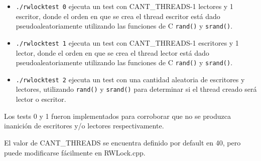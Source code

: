\begin{itemize}

\item {\texttt{./rwlocktest 0} ejecuta un test con CANT\_THREADS-1 lectores y 1 escritor, donde el orden en que se crea el thread escritor está dado pseudoaleatoriamente utilizando las funciones de C \texttt{rand()} y \texttt{srand()}.}

\item {\texttt{./rwlocktest 1} ejecuta un test con CANT\_THREADS-1 escritores y 1 lector, donde el orden en que se crea el thread lector está dado pseudoaleatoriamente utilizando las funciones de C \texttt{rand()} y \texttt{srand()}.}

\item {\texttt{./rwlocktest 2} ejecuta un test con una cantidad aleatoria de escritores y lectores, utilizando \texttt{rand()} y \texttt{srand()} para determinar si el thread creado será lector o escritor.}

\end{itemize}

\par Los tests 0 y 1 fueron implementados para corroborar que no se produzca inanición de escritores y/o lectores respectivamente. 
\par El valor de CANT\_THREADS se encuentra definido por default en 40, pero puede modificarse fácilmente en RWLock.cpp.


